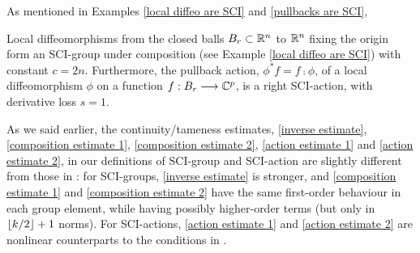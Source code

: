 \documentclass{article}
\begin{document}
As mentioned in Examples \ref{local diffeo are SCI} and \ref{pullbacks are SCI},
\begin{lem}\label{functions are SCI}
Local diffeomorphisms from the closed balls $B_r \subset \mathbb R^n$ to $\mathbb R^n$ fixing the origin form an SCI-group under composition (see Example \ref{local diffeo are SCI}) with constant $c=2n$.  Furthermore, the pullback action, $\phi^*f = f\comp\phi$, of a local diffeomorphism $\phi$ on a function $f:B_r\longrightarrow\mathbb C^p$, is a right SCI-action, with derivative loss $s=1$.
\end{lem}
As we said earlier, the continuity/tameness estimates, \eqref{inverse estimate}, \eqref{composition estimate 1}, \eqref{composition estimate 2}, \eqref{action estimate 1} and \eqref{action estimate 2}, in our definitions of SCI-group and SCI-action are slightly different from those in \cite{MirandaMonnierZung}: for SCI-groups, \eqref{inverse estimate} is stronger, and \eqref{composition estimate 1} and \eqref{composition estimate 2} have the same first-order behaviour in each group element, while having possibly higher-order terms (but only in $\left\lfloor k/2 \right\rfloor+1$ norms).  For SCI-actions, \eqref{action estimate 1} and \eqref{action estimate 2} are nonlinear counterparts to the conditions in \cite{MirandaMonnierZung}.
\end{document}
